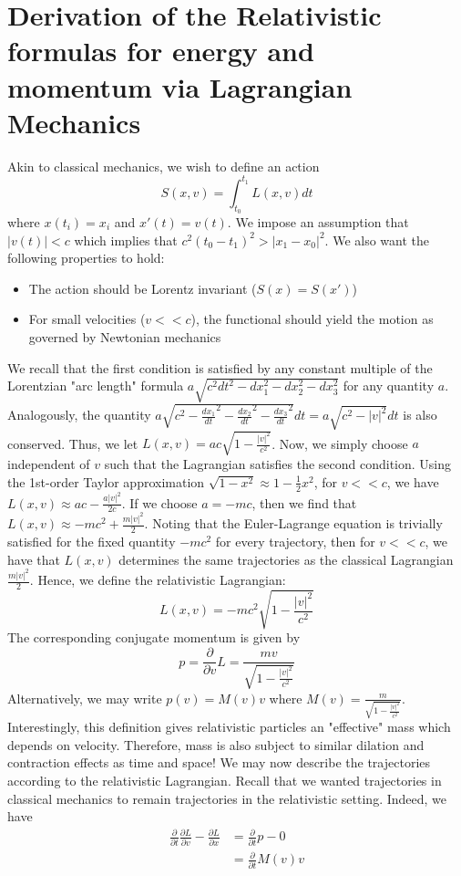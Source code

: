 \documentclass{article}
\newcommand{\nl}{\newline\newline\noindent}
\newcommand{\pd}[1]{\frac{\partial}{\partial #1}}
\newcommand{\pdof}[2]{\frac{\partial #1}{\partial #2}}
\begin{document}
\section*{Derivation of the Relativistic formulas for energy and momentum via Lagrangian Mechanics}
Akin to classical mechanics, we wish to define an action
\[ S(x, v) = \int_{t_0}^{t_1} L(x,v)dt\]
where $x(t_i) = x_i$ and $x'(t) = v(t)$. We impose an assumption that $|v(t)|<c$ which implies that $c^2(t_0-t_1)^2 > |x_1-x_0|^2$. We also want the following properties to hold:
\begin{itemize}
    \item The action should be Lorentz invariant ($S(x) = S(x')$)
    \item For small velocities ($v<<c$), the functional should yield the motion as governed by Newtonian mechanics
\end{itemize}
We recall that the first condition is satisfied by any constant multiple of the Lorentzian "arc length" formula $a\sqrt{c^2dt^2 - dx_1^2 - dx_2^2 -dx_3^2}$ for any quantity $a$. Analogously, the quantity $a\sqrt{c^2 - \frac{dx_1}{dt}^2 -\frac{dx_2}{dt}^2-\frac{dx_3}{dt}^2} dt= a\sqrt{c^2 - |v|^2} dt$ is also conserved. Thus, we let $L(x,v) = ac\sqrt{1 - \frac{|v|^2}{c^2}}$. Now, we simply choose $a$ independent of $v$ such that the Lagrangian satisfies the second condition. Using the 1st-order Taylor approximation $\sqrt{1-x^2} \approx 1-\frac{1}{2}x^2$, for $v<<c$, we have $L(x,v) \approx ac - \frac{a|v|^2}{2c}$. If we choose $a = -mc$, then we find that $L(x,v) \approx -mc^2 + \frac{m|v|^2}{2}$. Noting that the Euler-Lagrange equation is trivially satisfied for the fixed quantity $-mc^2$ for every trajectory, then for $v<<c$, we have that $L(x,v)$ determines the same trajectories as the classical Lagrangian $\frac{m|v|^2}{2}$. Hence, we define the relativistic Lagrangian:
\[L(x,v) = -mc^2 \sqrt{1-\frac{|v|^2}{c^2}}\]
The corresponding conjugate momentum is given by
\[p = \pd{v}L = \frac{mv}{\sqrt{1-\frac{|v|^2}{c^2}}}\]
Alternatively, we may write $p(v) = M(v)v$ where $M(v) =  \frac{m}{\sqrt{1-\frac{|v|^2}{c^2}}}$. Interestingly, this definition gives relativistic particles an "effective" mass which depends on velocity. Therefore, mass is also subject to similar dilation and contraction effects as time and space!
\nl
We may now describe the trajectories according to the relativistic Lagrangian. Recall that we wanted trajectories in classical mechanics to remain trajectories in the relativistic setting. Indeed, we have
\begin{align*}
    \pd{t}\pdof{L}{v} - \pdof{L}{x} &= \pd{t}p - 0\\
    &=\pd{t}M(v) v
\end{align*}
\end{document}
